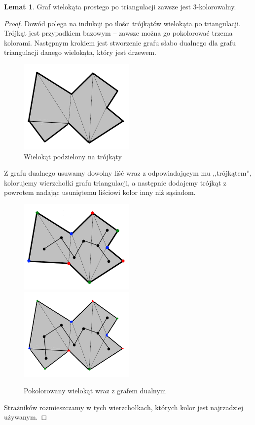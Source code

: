 \documentclass[brudnopis]{xmgr}
\theoremstyle{definition}
\newtheorem{Lemat}{Lemat}
\begin{document}
\begin{Lemat} \cite{fisk}
Graf wielokąta prostego po triangulacji zawsze jest $3$-kolorowalny.
\end{Lemat}
\begin{proof}
	Dowód polega na indukcji po ilości trójkątów wielokąta po triangulacji. Trójkąt jest przypadkiem bazowym -- zawsze można go pokolorować trzema kolorami. Następnym krokiem jest stworzenie grafu słabo dualnego dla grafu triangulacji danego wielokąta, który jest drzewem.
	\begin{figure}[ht!]
	  \centering
	  \includegraphics{rysunki/dual.png}
	    \caption{Wielokąt podzielony na trójkąty}
	\end{figure} 
	Z grafu dualnego usuwamy dowolny liść wraz z odpowiadającym mu ,,trójkątem'', kolorujemy wierzchołki grafu triangulacji, a następnie dodajemy trójkąt z powrotem nadając usuniętemu liściowi kolor inny niż sąsiadom.
	\begin{figure}[ht!]
	  \centering
	    \includegraphics{rysunki/dual_kolor.png} 
	    \includegraphics{rysunki/dual_caly_kolor.png}
	    \caption{Pokolorowany wielokąt wraz z grafem dualnym}
	\end{figure} 
	Strażników rozmieszczamy w tych wierzchołkach, których kolor jest najrzadziej używanym.
\end{proof}
\end{document}
